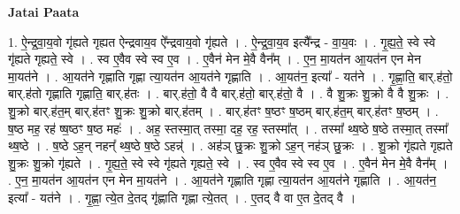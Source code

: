 \documentclass[17pt]{extarticle}
\begin{document}
\textbf{Jatai Paata} \newline

1. ऐ॒न्द्र॒वा॒य॒वो गृ॑ह्यते गृह्यत ऐन्द्रवाय॒व ऐ᳚न्द्रवाय॒वो गृ॑ह्यते । . ऐ॒न्द्र॒वा॒य॒व इत्यै᳚न्द्र - वा॒य॒वः । . गृ॒ह्य॒ते॒ स्वे स्वे गृ॑ह्यते गृह्यते॒ स्वे । . स्व ए॒वैव स्वे स्व ए॒व । . ए॒वैन॑ मेन मे॒वै वैन᳚म् । . ए॒न॒ मा॒यत॑न आ॒यत॑न एन मेन मा॒यत॑ने । . आ॒यत॑ने गृह्णाति गृह्णा त्या॒यत॑न आ॒यत॑ने गृह्णाति । . आ॒यत॑न॒ इत्या᳚ - यत॑ने । . गृ॒ह्णा॒ति॒ बार्.ह॑तो॒ बार्.ह॑तो गृह्णाति गृह्णाति॒ बार्.ह॑तः । . बार्.ह॑तो॒ वै वै बार्.ह॑तो॒ बार्.ह॑तो॒ वै । . वै शु॒क्रः शु॒क्रो वै वै शु॒क्रः । . शु॒क्रो बार्.ह॑त॒म् बार्.ह॑तꣳ शु॒क्रः शु॒क्रो बार्.ह॑तम् । . बार्.ह॑तꣳ ष॒ष्ठꣳ ष॒ष्ठम् बार्.ह॑त॒म् बार्.ह॑तꣳ ष॒ष्ठम् । . ष॒ष्ठ मह॒ रह॑ ष्ष॒ष्ठꣳ ष॒ष्ठ महः॑ । . अह॒ स्तस्मा॒त् तस्मा॒ दह॒ रह॒ स्तस्मा᳚त् । . तस्मा᳚ थ्ष॒ष्ठे ष॒ष्ठे तस्मा॒त् तस्मा᳚ थ्ष॒ष्ठे । . ष॒ष्ठे ऽह॒न् नहन्᳚ थ्ष॒ष्ठे ष॒ष्ठे ऽहन्न्॑ । . अह॑ञ् छु॒क्रः शु॒क्रो ऽह॒न् नह॑ञ् छु॒क्रः । . शु॒क्रो गृ॑ह्यते गृह्यते शु॒क्रः शु॒क्रो गृ॑ह्यते । . गृ॒ह्य॒ते॒ स्वे स्वे गृ॑ह्यते गृह्यते॒ स्वे । . स्व ए॒वैव स्वे स्व ए॒व । . ए॒वैन॑ मेन मे॒वै वैन᳚म् । . ए॒न॒ मा॒यत॑न आ॒यत॑न एन मेन मा॒यत॑ने । . आ॒यत॑ने गृह्णाति गृह्णा त्या॒यत॑न आ॒यत॑ने गृह्णाति । . आ॒यत॑न॒ इत्या᳚ - यत॑ने । . गृ॒ह्णा॒ त्ये॒त दे॒तद् गृ॑ह्णाति गृह्णा त्ये॒तत् । . ए॒तद् वै वा ए॒त दे॒तद् वै । \newline
\end{document}
